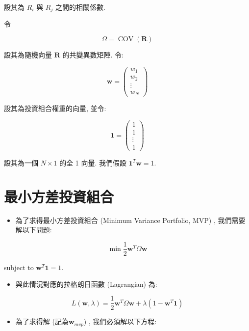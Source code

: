 \documentclass[letterpaper]{article}
\begin{document}
		設其為 $R_{i}$ 與 $R_{j}$ 之間的相關係數. 
		
		令
		
		$$
		\Omega=\operatorname{COV} (\mathbf{R}) 
		$$
		
		設其為隨機向量 $\mathbf{R}$ 的共變異數矩陣. 令: 
		
		$$
		\mathbf{w}=\left (\begin{array}{c}
			w_{1} \\
			w_{2} \\
			\vdots \\
			w_{N}
		\end{array}\right) 
		$$
		
		設其為投資組合權重的向量, 並令: 
		
		$$
		\mathbf{1}=\left (\begin{array}{c}
			1 \\
			1 \\
			\vdots \\
			1
		\end{array}\right) 
		$$
		
		設其為一個 $N \times 1$ 的全 1 向量. 我們假設 $\mathbf{1}^{T} \mathbf{w} = 1$. 
		
		
		\section{最小方差投資組合}
		\begin{itemize}
			\item 為了求得最小方差投資組合 (Minimum Variance Portfolio, MVP) , 我們需要解以下問題: 
		\end{itemize}
		
		$$
		\min \frac{1}{2} \mathbf{w}^{T} \Omega \mathbf{w}
		$$
		
		subject to $\mathbf{w}^{T} \mathbf{1}=1$.
		
		\begin{itemize}
			\item 與此情況對應的拉格朗日函數 (Lagrangian) 為: 
		\end{itemize}
		
		
		$$
		L (\mathbf{w}, \lambda) =\frac{1}{2} \mathbf{w}^{T} \Omega \mathbf{w}+\lambda\left (1-\mathbf{w}^{T} \mathbf{1}\right) 
		$$
		
		\begin{itemize}
			\item 為了求得解 (記為$\mathbf{w}_{mvp}$) , 我們必須解以下方程: 
		\end{itemize}
		
		
		
\end{document}
